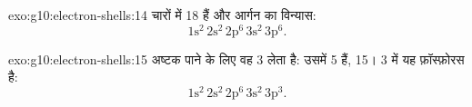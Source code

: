 \begin{solution}{exo:g10:electron-shells:14}
चारों में 18  हैं और आर्गन का विन्यास:
\[ 1\mathrm{s}^2\,2\mathrm{s}^2\,2\mathrm{p}^6\,3\mathrm{s}^2\,3\mathrm{p}^6. \]
\end{solution}

\begin{solution}{exo:g10:electron-shells:15}
अष्टक पाने के लिए वह 3  लेता है: उसमें 5  हैं, 
15।  3 में यह फ़ॉस्फ़ोरस है:
\[ 1\mathrm{s}^2\,2\mathrm{s}^2\,2\mathrm{p}^6\,3\mathrm{s}^2\,3\mathrm{p}^3. \]
\end{solution}


